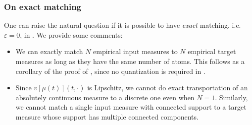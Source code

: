 \documentclass[a4paper,11pt]{article}
\theoremstyle{plain}
\numberwithin{equation}{section}
\newcommand{\nddrb}[1]{ {\text{{\bf drb:}} \color{magenta}{#1} } }
\newcommand{\npdr}[1]{ {\colorbox{MIT}{\color{white} \textsf{PR}} \color{MIT}{#1}} }
\begin{document}
\subsubsection{On exact matching} 
One can raise the natural question if it is possible to have \emph{exact} matching. i.e. $\varepsilon=0$, in . We provide some comments:

\begin{itemize}
    \item We can exactly match $N$ empirical input measures to $N$ empirical target measures as long as they have the same number of atoms. This follows as a corollary of the proof of , since no quantization is required in . %
    
    \item Since $v[\mu(t)](t,\cdot)$ is Lipschitz, we cannot do exact transportation of an absolutely continuous measure to a discrete one even when $N=1$. Similarly, we cannot match a single input measure with connected support to a target measure whose support has multiple connected components. 
\end{itemize}
\end{document}
